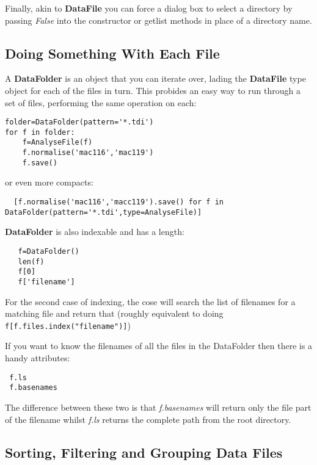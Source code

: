 \documentclass[a4paper,11pt]{scrartcl}
\begin{document}
Finally, akin to \textbf{DataFile} you can force a dialog box to select a directory by passing \textit{False} into the constructor or getlist methods in place of a directory name.

\subsection{Doing Something With Each File}

A \textbf{DataFolder} is an object that you can iterate over, lading the \textbf{DataFile} type object for each of the files in turn. This probides an easy way to run through a set of files, performing the same operation on each:

\begin{lstlisting}
folder=DataFolder(pattern='*.tdi')
for f in folder:
	f=AnalyseFile(f)
  	f.normalise('mac116','mac119')
 	f.save()
\end{lstlisting}

or even more compacts:

\begin{lstlisting}
  [f.normalise('mac116','macc119').save() for f in DataFolder(pattern='*.tdi',type=AnalyseFile)]
\end{lstlisting}

\textbf{DataFolder} is also indexable and has a length:

\begin{lstlisting}
   f=DataFolder()
   len(f)
   f[0]
   f['filename']
\end{lstlisting}

For the second case of indexing, the cose will search the list of filenames for a matching file and return that (roughly equivalent to doing \verb#f[f.files.index("filename")]#)

If you want to know the filenames of all the files in the DataFolder then there is a handy attributes:
\begin{lstlisting}
 f.ls
 f.basenames
\end{lstlisting}

The difference between these two is that \textit{f.basenames} will return only the file part of the filename whilst \textit{f.ls} returns the complete path from the root directory.

\subsection{Sorting, Filtering and Grouping Data Files}\label{groups}
\end{document}

